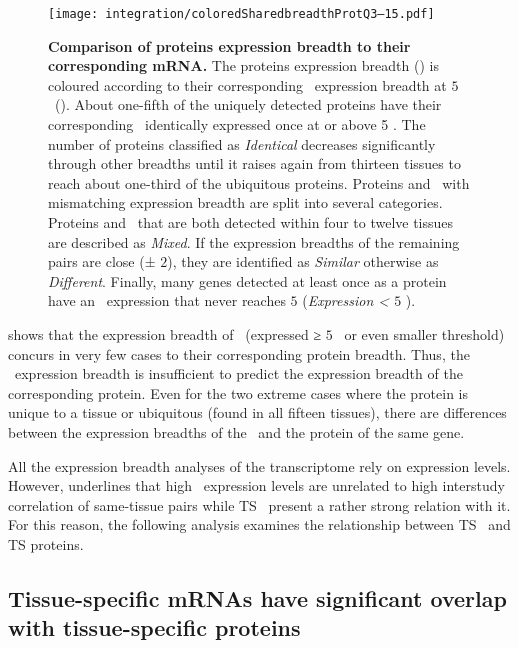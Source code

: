 \begin{figure}[!htb]
    \texttt{[image: integration/coloredSharedbreadthProtQ3--15.pdf]}\centering
    \vspace{-4mm}
    \caption[Comparison of proteins expression breadth to
    corresponding mRNA breadth]{\label{fig:SharedBreadthProtQ3}%
    \textbf{Comparison of proteins expression breadth to their corresponding mRNA.}
    The proteins expression breadth ()
    is coloured according to
    their corresponding \mRNA\ expression breadth at $5$ \FPKM\
    ().
    About one-fifth of the uniquely detected proteins have
    their corresponding \mRNA\ identically expressed once at or above 5 \FPKM{}.
    The number of proteins classified as \emph{Identical} decreases significantly
    through other breadths until it raises again from thirteen tissues
    to reach about one-third of the ubiquitous proteins.
    Proteins and \mRNAs\ with mismatching expression breadth are split into
    several categories.
    Proteins and \mRNAs\ that are both detected within four to twelve tissues
    are described as \emph{Mixed}.
    If the expression breadths of the remaining pairs are close (± $2$),
    they are identified as \emph{Similar} otherwise as \emph{Different}.
    Finally, many genes detected at least once as a protein have
    an \mRNA\ expression that never reaches $5$ \FPKM{} (\emph{Expression < $5$ \FPKM}).
    }
\end{figure}

 shows that the expression breadth
of \mRNAs\ (expressed ≥ $5$ \FPKM\ or even smaller threshold) concurs
in very few cases to their corresponding protein breadth.
Thus, the \mRNA\ expression breadth is insufficient
to predict the expression breadth of the corresponding protein.
Even for the two extreme cases
where the protein is unique to a tissue or ubiquitous (found in all fifteen tissues),
there are differences between the expression breadths of the \mRNA\ and the protein
of the same gene.\mybr\

All the expression breadth analyses of the transcriptome rely on expression levels.
However, \Cref{ch:Transcriptomics} underlines that
high \mRNA\ expression levels are unrelated
to high interstudy correlation of same-tissue pairs
while \gls{TS} \mRNAs\ present a rather strong relation with it.
For this reason, the following analysis examines
the relationship between \gls{TS} \mRNAs\ and \gls{TS} proteins.\mybr\


\subsection{Tissue-specific \texorpdfstring{\MakeLowercase{m}RNAs}{mRNAs} %
have significant overlap with tissue-specific proteins}\label{sec:TSprotMrna}

